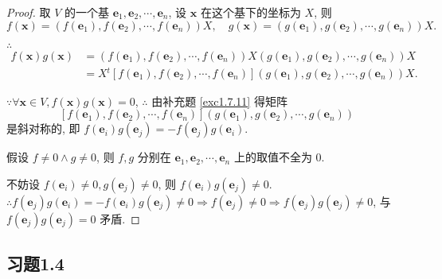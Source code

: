 \documentclass[color=black,device=normal,lang=cn,mode=geye]{elegantnote}
\begin{document}
\begin{proof}
    取 $V$ 的一个基 $\boldsymbol{e}_1,\boldsymbol{e}_2,\cdots,\boldsymbol{e}_n$, 设 $\boldsymbol{x}$ 在这个基下的坐标为 $X$, 则
    \[f(\boldsymbol{x})=(f(\boldsymbol{e}_1),f(\boldsymbol{e}_2),\cdots,f(\boldsymbol{e}_n))X,\quad g(\boldsymbol{x})=(g(\boldsymbol{e}_1),g(\boldsymbol{e}_2),\cdots,g(\boldsymbol{e}_n))X.\]

    $\therefore$
    \begin{align*}
        f(\boldsymbol{x})g(\boldsymbol{x}) & =(f(\boldsymbol{e}_1),f(\boldsymbol{e}_2),\cdots,f(\boldsymbol{e}_n))X(g(\boldsymbol{e}_1),g(\boldsymbol{e}_2),\cdots,g(\boldsymbol{e}_n))X \\
        & =X{}^t[f(\boldsymbol{e}_1),f(\boldsymbol{e}_2),\cdots,f(\boldsymbol{e}_n)](g(\boldsymbol{e}_1),g(\boldsymbol{e}_2),\cdots,g(\boldsymbol{e}_n))X.
    \end{align*}

    $\because\forall\boldsymbol{x}\in V,f(\boldsymbol{x})g(\boldsymbol{x})=0$, $\therefore$ 由补充题 \ref{exc1.7.11} 得矩阵
    \[[f(\boldsymbol{e}_1),f(\boldsymbol{e}_2),\cdots,f(\boldsymbol{e}_n)](g(\boldsymbol{e}_1),g(\boldsymbol{e}_2),\cdots,g(\boldsymbol{e}_n))\]
    是斜对称的, 即 $f(\boldsymbol{e}_i)g(\boldsymbol{e}_j)=-f(\boldsymbol{e}_j)g(\boldsymbol{e}_i)$.

    假设 $f\neq0\wedge g\neq0$, 则 $f,g$ 分别在 $\boldsymbol{e}_1,\boldsymbol{e}_2,\cdots,\boldsymbol{e}_n$ 上的取值不全为 $0$.

    不妨设 $f(\boldsymbol{e}_i)\neq0,g(\boldsymbol{e}_j)\neq0$, 则 $f(\boldsymbol{e}_i)g(\boldsymbol{e}_j)\neq0$. $\therefore f(\boldsymbol{e}_j)g(\boldsymbol{e}_i)=-f(\boldsymbol{e}_i)g(\boldsymbol{e}_j)\neq0\Rightarrow f(\boldsymbol{e}_j)\neq0\Rightarrow f(\boldsymbol{e}_j)g(\boldsymbol{e}_j)\neq0$, 与 $f(\boldsymbol{e}_j)g(\boldsymbol{e}_j)=0$ 矛盾.
\end{proof}
\subsection{习题1.4}
\end{document}

